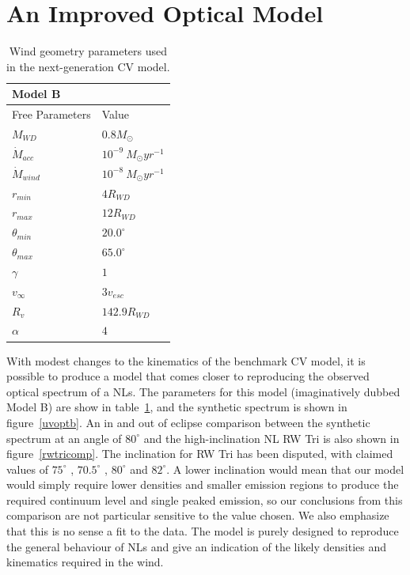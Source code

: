 \documentclass[preprint, a4paper, 11pt]{aastex}
\begin{document}
\section{An Improved Optical Model }

\begin{table}
\centering
\begin{tabular}{p{3cm}p{4cm}}
Model B \\
\hline Free Parameters 	&	 Value \\ 
\hline \hline 
$M_{WD}$ 	 &	 $0.8 M_{\odot}$ \\ 
$\dot{M}_{acc}$ 	 &	 $10^{-9}~M_{\odot}yr^{-1}$\\ 
$\dot{M}_{wind}$  &	$10^{-8}~M_{\odot}yr^{-1}$\\ 
$r_{min}$ 	&	 $4 R_{WD}$\\ 
$r_{max}$ 	&	 $12 R_{WD}$ \\ 
$\theta_{min}$ 	&	 $20.0^{\circ}$ \\ 
$\theta_{max}$ 	&	 $65.0^{\circ}$ \\ 
$\gamma$ 	&	 $1$ \\ 
$v_{\infty}$ 	&	 $3v_{esc}$ \\ 
$R_v$ 	        &	 $142.9 R_{WD}$ \\ 
$\alpha$ 	&	 $4$ \\
\end{tabular}
\centering
\caption{Wind geometry parameters used in the next-generation CV model.}
\label{modelb}
\end{table}

With modest changes to the kinematics of the benchmark CV model,
it is possible to produce a model
that comes closer to reproducing the observed optical spectrum
of a NLs. The parameters for this model (imaginatively dubbed Model B)
are show in table~\ref{modelb}, and the synthetic spectrum
is shown in figure~\ref{uvoptb}. An in and out of eclipse comparison 
between the synthetic spectrum
at an angle of $80^\circ$ and the high-inclination NL RW Tri 
is also shown in figure~\ref{rwtricomp}. The inclination
for RW Tri has been disputed, with claimed values of $75^\circ$ \citep{groot2004},
$70.5^\circ$ \citep{smak1995}, $80^\circ$ \citep{longmore1981} and 
$82^\circ$\citep{frankking1981}. A lower inclination
would mean that our model would simply require lower densities 
and smaller emission regions to produce the required continuum level
and single peaked emission, so our conclusions from this comparison are
not particular sensitive to the value chosen.
We also emphasize that this is no sense a fit to the data. The model
is purely designed to reproduce the general behaviour of NLs
and give an indication of the likely densities and kinematics 
required in the wind.
\end{document}

